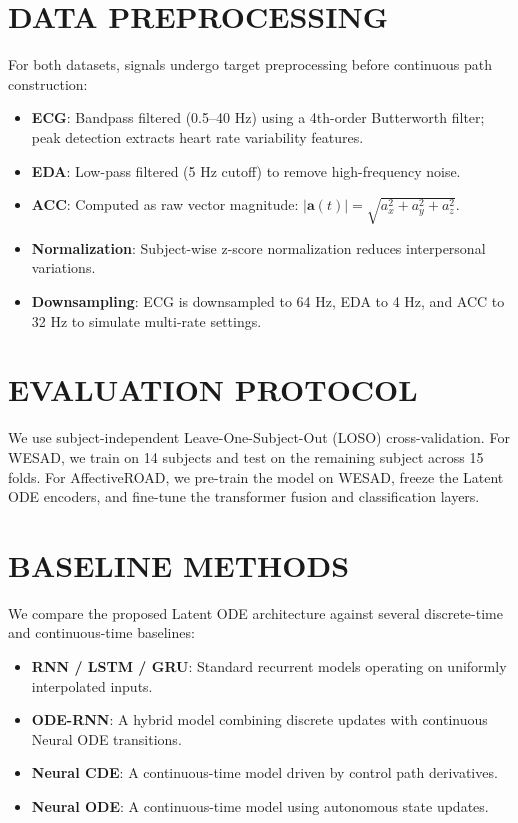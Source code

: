 \documentclass[12pt, a4paper]{report}
\numberwithin{equation}{chapter}
\begin{document}
\section{DATA PREPROCESSING}
For both datasets, signals undergo target preprocessing before continuous path construction:
\begin{itemize}
    \setlength{\itemsep}{2pt}
    \setlength{\parskip}{0pt}
    \setlength{\parsep}{0pt}
    \item \textbf{ECG}: Bandpass filtered (0.5--40 Hz) using a 4th-order Butterworth filter; peak detection extracts heart rate variability features.
    \item \textbf{EDA}: Low-pass filtered (5 Hz cutoff) to remove high-frequency noise.
    \item \textbf{ACC}: Computed as raw vector magnitude: $|\mathbf{a}(t)| = \sqrt{a_x^2 + a_y^2 + a_z^2}$.
    \item \textbf{Normalization}: Subject-wise z-score normalization reduces interpersonal variations.
    \item \textbf{Downsampling}: ECG is downsampled to 64 Hz, EDA to 4 Hz, and ACC to 32 Hz to simulate multi-rate settings.
\end{itemize}

\section{EVALUATION PROTOCOL}
We use subject-independent Leave-One-Subject-Out (LOSO) cross-validation. For WESAD, we train on 14 subjects and test on the remaining subject across 15 folds. For AffectiveROAD, we pre-train the model on WESAD, freeze the Latent ODE encoders, and fine-tune the transformer fusion and classification layers.

\section{BASELINE METHODS}
We compare the proposed Latent ODE architecture against several discrete-time and continuous-time baselines:
\begin{itemize}
    \setlength{\itemsep}{2pt}
    \setlength{\parskip}{0pt}
    \setlength{\parsep}{0pt}
    \item \textbf{RNN / LSTM / GRU}: Standard recurrent models operating on uniformly interpolated inputs.
    \item \textbf{ODE-RNN}: A hybrid model combining discrete updates with continuous Neural ODE transitions.
    \item \textbf{Neural CDE}: A continuous-time model driven by control path derivatives.
    \item \textbf{Neural ODE}: A continuous-time model using autonomous state updates.
\end{itemize}
\end{document}
